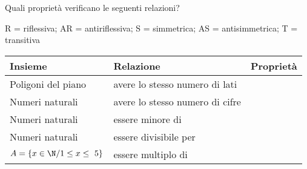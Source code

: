\begin{comment}
\begin{enumeratea}
\item nel suo grafo almeno un elemento non presenta il cappio;
\item la relazione è antisimmetrica;
\item la relazione è transitiva;
\item l'insieme~\(G_\Rel\) è costituito dalle 
coppie~\((1,2)\), \((1,4)\), \((3,4)\), \((4,2)\)
\end{enumeratea}
\end{esercizio}
\end{multicols}
\begin{inaccessibleblock}[Figura: TODO]
 \begin{figure}[t]
\begin{minipage}[b]{.45\textwidth}
 \centering
 
 \caption{Esercizio \ref{ese:B.26}.}\label{fig:B.17}
\end{minipage}\
\begin{minipage}[b]{.45\textwidth}
 \centering
 
 \caption{Esercizio \ref{ese:B.28}.}\label{fig:B.18}
\end{minipage}
\end{figure}
\end{inaccessibleblock}


\end{comment}

\newpage %

\begin{esercizio}
\label{ese:B.29}
Quali proprietà verificano le seguenti relazioni?
\begin{center}
R = riflessiva; AR = antiriflessiva; S = simmetrica; AS = antisimmetrica; 
T = transitiva
\end{center}
\begin{center}
\begin{tabular}{llc}
\toprule
Insieme & Relazione & Proprietà\\
\midrule
Poligoni del piano & avere lo stesso numero di lati & 
 \boxR\quad\boxAR\quad\boxS\quad\boxAS\quad\boxT\\
Numeri naturali & avere lo stesso numero di cifre &
 \boxR\quad\boxAR\quad\boxS\quad\boxAS\quad\boxT\\
Numeri naturali & essere minore di &
 \boxR\quad\boxAR\quad\boxS\quad\boxAS\quad\boxT\\
Numeri naturali & essere divisibile per &
 \boxR\quad\boxAR\quad\boxS\quad\boxAS\quad\boxT\\
\(A = \{ x \in \N / 1 \leq x \leq~5 \}\) & essere multiplo di &
 \boxR\quad\boxAR\quad\boxS\quad\boxAS\quad\boxT\\
\bottomrule
\end{tabular}
\end{center}
\end{esercizio}

